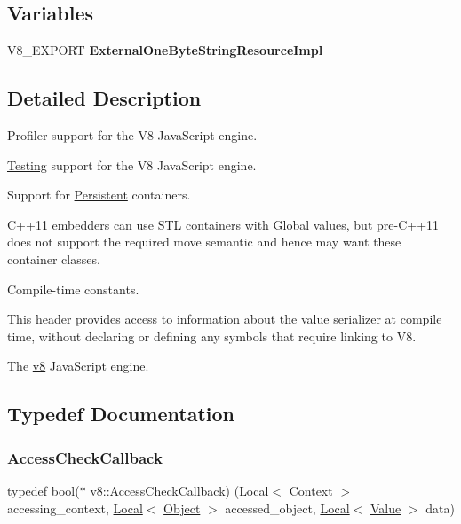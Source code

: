 \subsection*{Variables}
\begin{DoxyCompactItemize}
\item 
\mbox{\label{namespacev8_a334d0c3d287d168d13b385852d2ba541}} 
V8\+\_\+\+E\+X\+P\+O\+RT {\bfseries External\+One\+Byte\+String\+Resource\+Impl}
\end{DoxyCompactItemize}


\subsection{Detailed Description}
Profiler support for the V8 Java\+Script engine.

\mbox{\hyperlink{classv8_1_1Testing}{Testing}} support for the V8 Java\+Script engine.

Support for \mbox{\hyperlink{classv8_1_1Persistent}{Persistent}} containers.

C++11 embedders can use S\+TL containers with \mbox{\hyperlink{classv8_1_1Global}{Global}} values, but pre-\/\+C++11 does not support the required move semantic and hence may want these container classes.

Compile-\/time constants.

This header provides access to information about the value serializer at compile time, without declaring or defining any symbols that require linking to V8.

The \mbox{\hyperlink{namespacev8}{v8}} Java\+Script engine. 

\subsection{Typedef Documentation}
\mbox{\label{namespacev8_a1024fb358d107c1494163217830688e6}} 
\subsubsection{\texorpdfstring{Access\+Check\+Callback}{AccessCheckCallback}}
{\footnotesize\ttfamily typedef \mbox{\hyperlink{classbool}{bool}}($\ast$ v8\+::\+Access\+Check\+Callback) (\mbox{\hyperlink{classv8_1_1Local}{Local}}$<$ Context $>$ accessing\+\_\+context, \mbox{\hyperlink{classv8_1_1Local}{Local}}$<$ \mbox{\hyperlink{classv8_1_1Object}{Object}} $>$ accessed\+\_\+object, \mbox{\hyperlink{classv8_1_1Local}{Local}}$<$ \mbox{\hyperlink{classv8_1_1Value}{Value}} $>$ data)}

